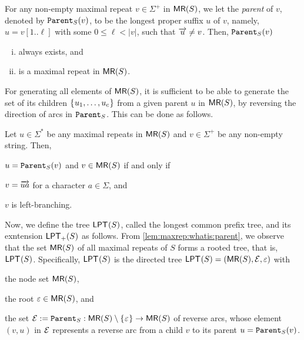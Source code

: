 \documentclass{article}
\begin{document}
\begin{lemma}\label{lem:maxrep:whatis:parent}
  For any non-empty maximal repeat $v \in \Sigma^+$ in $\MR(S)$, we let the \textit{parent} of $v$, denoted by $\Parent(v)$, to be the longest proper suffix $u$ of $v$, namely, $u = v[1..\ell]$ with some $0\le \ell < |v|$, such that $\rext{u} \not= v$.
  Then, $\Parent(v)$ 
  \begin{enumerate}[(i)]
  \item always exists, and 
  \item is a maximal repeat in $\MR(S)$. 
  \end{enumerate}
\end{lemma}

For generating all elements of $\MR(S)$, it is sufficient to be able to generate the set of its children $\set{u_1, \dots, u_c}$ from a given parent $u$ in $\MR(S)$, 
by reversing the direction of arcs in $\Parent$. This can be done as follows.


\begin{lemma}\label{lem:maxrep:howto:child}
Let $u \in \Sigma^*$ be any maximal repeats in $\MR(S)$ and $v \in \Sigma^+$ be any non-empty string. Then, 
\begin{enumerate*}[(1)]
\item $u = \Parent(v)$ and $v \in \MR(S)$ if and only if 
\item
  \begin{enumerate*}[(i)]
  \item $v = \rext{ua}$ for a character $a\in \Sigma$, and
  \item $v$ is left-branching. 
  \end{enumerate*}
\end{enumerate*}
\end{lemma}

Now, we define the tree $\LPT(S)$, called the longest common prefix tree, and its exntension $\LPT[+](S)$ as follows.
From \cref{lem:maxrep:whatis:parent}, we observe that the set $\MR(S)$ of all maximal repeats of $S$ forms a rooted tree, that is, $\LPT(S)$. Specifically, $\LPT(S)$ is the directed tree $\LPT(S) = (\MR(S), \sig E, \eps)$ with
\begin{enumerate*}[(i)]
\item the node set $\MR(S)$, 
\item the root $\eps \in \MR(S)$,   and
\item the set $\sig E := \Parent: \MR(S)\setminus\set{\eps} \to \MR(S)$ of reverse arcs, whose element $(v, u)$ in $\sig E$ represents a reverse arc from a child $v$ to its parent $u  = \Parent(v)$. 
\end{enumerate*}
\end{document}

